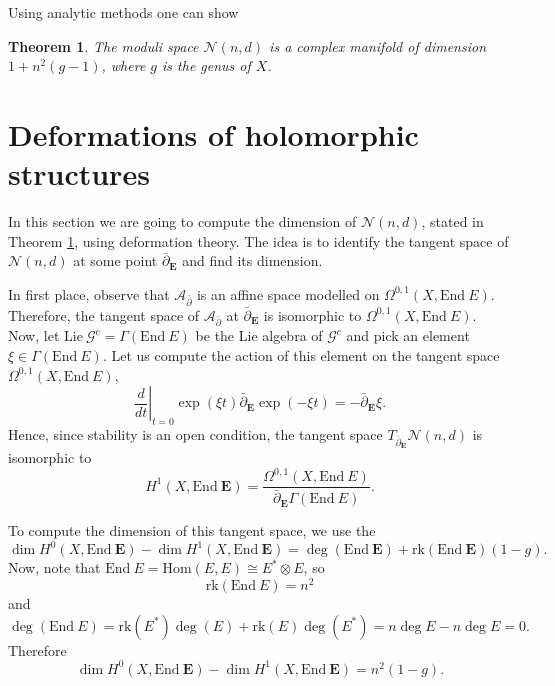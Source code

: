 \documentclass[12pt,a4paper]{book}
\newtheorem{thm}{Theorem}[section]
\theoremstyle{definition} \newtheorem{defn}[thm]{Definition}
\theoremstyle{definition} \newtheorem{ejemplo}[thm]{Example}
\theoremstyle{remark} \newtheorem{rem}[thm]{Remark}
\def\AA{\mathscr{A}}
\def\GG{\mathscr{G}}
\def\rk{\mathrm{rk}}
\def\Lie{\mathrm{Lie}}
\def\End{\mathrm{End}}
\def\Hom{\mathrm{Hom}}
\def\Bun{\mathscr{N}}
\def\delbar{\bar{\partial}}
\newcommand{\ve}[1]{\mathbf{#1}}
\let\emph\relax
\begin{document}
	   Using analytic methods \cite{kobayashi} one can show
	   \begin{thm}\label{modulibundles}
	     The moduli space $\Bun(n,d)$ is a complex manifold of dimension $1+n^2(g-1)$, where $g$ is the genus of $X$.
	   \end{thm}

	   \section{Deformations of holomorphic structures}\label{deformationsholomorphic}
	   In this section we are going to compute the dimension of $\Bun(n,d)$, stated in Theorem \ref{modulibundles}, using deformation theory. The idea is to identify the tangent space of $\Bun(n,d)$ at some point $\delbar_\ve{E}$ and find its dimension. 

	   In first place, observe that $\AA_{\delbar}$ is an affine space modelled on $\Omega^{0,1}(X,\End\ E)$. Therefore, the tangent space of $\AA_{\delbar}$ at $\delbar_{\ve{E}}$ is isomorphic to $\Omega^{0,1}(X,\End\ E)$. Now, let $\Lie\ \GG^c = \Gamma(\End\ E)$ be the Lie algebra of $\GG^c$ and pick an element $\xi \in \Gamma(\End\ E)$. Let us compute the action of this element on the tangent space $\Omega^{0,1}(X,\End\ E)$,
	   \begin{equation*}
	     \left. \frac{d}{dt} \right|_{t=0} \exp(\xi t)  \delbar_{\ve{E}} \exp(-\xi t) = -\delbar_\ve{E} \xi.
	   \end{equation*}
	   Hence, since stability is an open condition, the tangent space $T_{\delbar_{\ve{E}}}\Bun(n,d)$ is isomorphic to
	   \begin{equation*}
	     H^1(X,\End\ \ve{E})=\frac{\Omega^{0,1}(X,\End\ E)}{\delbar_\ve{E} \Gamma(\End\ E)}.
	   \end{equation*}

	   To compute the dimension of this tangent space, we use the \emph{Riemann--Roch theorem}
	   \begin{equation*}
	     \dim H^0(X,\End\ \ve{E}) - \dim H^1(X,\End\ \ve{E})=\deg(\End\ \ve{E}) + \rk(\End\ \ve{E})(1-g).
	   \end{equation*}
	   Now, note that $\End\ E=\Hom(E,E)\cong E^*\otimes E$, so
	   \begin{equation*}
	     \rk(\End\ E)=n^2
	   \end{equation*}
	   and
	   \begin{equation*}
	     \deg(\End\ E)=\rk(E^*)\deg(E) + \rk(E)\deg(E^*)=n\deg E - n\deg E=0.
	   \end{equation*}
	   Therefore
	   \begin{equation*}
	     \dim H^0(X,\End\ \ve{E}) - \dim H^1(X,\End\ \ve{E})=n^2(1-g).
	   \end{equation*}
\end{document}
